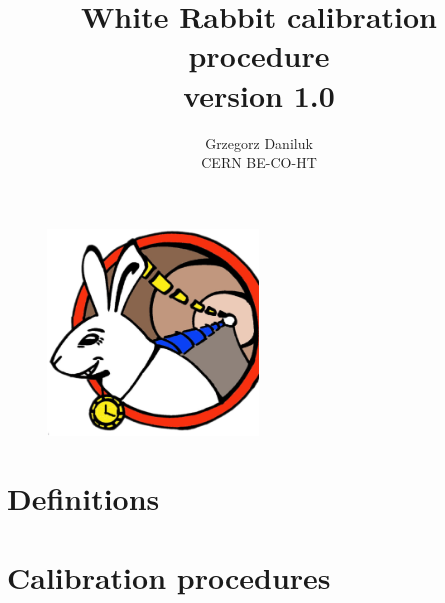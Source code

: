 \documentclass[a4paper, 12pt]{article}
\begin{document}
\title{White Rabbit calibration procedure\\[0.5cm]
\large {version 1.0}}
\author{Grzegorz Daniluk\\ CERN BE-CO-HT}

\maketitle
\thispagestyle{empty}

\begin{figure}[ht!]
  \centering
  \vspace{1.3cm}
  \includegraphics[width=0.50\textwidth]{logo/WRlogo.ps}
  \label{fig:wr_logo}
\end{figure}

\newpage

\newpage

\newpage

\tableofcontents

\newpage


\newpage
\section{Definitions}


\newpage


\newpage
\section{Calibration procedures}
\label{sec:calib_proc}


\newpage


\newpage


\appendix
\newpage

\newpage


\newpage


\end{document}
